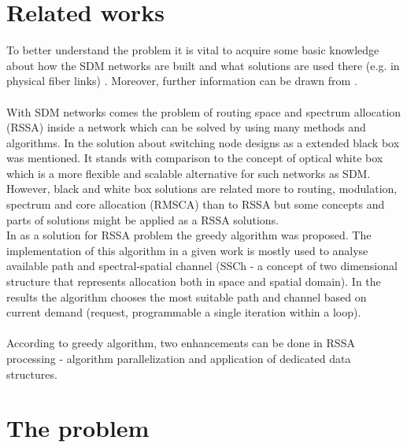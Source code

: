 \documentclass[conference]{IEEEtran}
\begin{document}
\section{Related works}
To better understand the problem it is vital to acquire some basic knowledge about how the SDM networks are built and what solutions are used there (e.g. in physical fiber links) \cite{sdm-intro}.
Moreover, further information can be drawn from \cite{rssa2}.
\\ \\
With SDM networks comes the problem of routing space and spectrum allocation (RSSA) inside a network which can be solved by using many methods and algorithms. In \cite{wb-box} the solution about  switching node designs as a extended black box was mentioned. It stands with comparison to the concept of optical white box which is a more flexible and scalable alternative for such networks as SDM. However, black and white box solutions are related more to routing, modulation, spectrum and core allocation (RMSCA) than to RSSA but some concepts and parts of solutions might be applied as a RSSA solutions.
\\
In \cite{sdm-walko} as a solution for RSSA problem the greedy algorithm was proposed. The implementation of this algorithm in a given work is mostly used to analyse available path and spectral-spatial channel (SSCh - a concept of two dimensional structure that represents allocation both in space and spatial domain). In the results the algorithm chooses the most suitable path and channel based on current demand (request, programmable a single iteration within a loop).
\\ \\
According to greedy algorithm, two enhancements can be done in RSSA processing - algorithm parallelization and application of dedicated
data structures\cite{rssa}.

\section{The problem}
\end{document}
